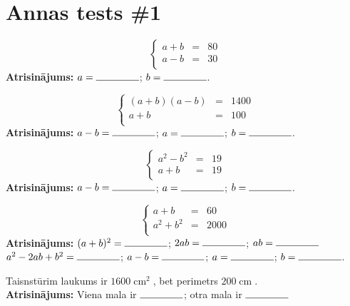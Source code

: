 \documentclass[11pt]{article}
\begin{document}
\section{Annas tests \#1}



\begin{problem}
\[
\left\{
\begin{array}{lcl}
a + b & = & 80 \\
a - b & = & 30 \\
\end{array}
\right.
\]
{\bf Atrisinājums:} $a = \rule{10ex}{.4pt}$; $b = \rule{10ex}{.4pt}$.
\end{problem}

\begin{problem}
\[
\left\{
\begin{array}{lcl}
(a+b)(a - b) & = & 1400 \\
a + b & = & 100 \\
\end{array}
\right.
\]
{\bf Atrisinājums:} $a - b = \rule{10ex}{.4pt}$; $a = \rule{10ex}{.4pt}$; $b = \rule{10ex}{.4pt}$.
\end{problem}

\begin{problem}
\[
\left\{
\begin{array}{lcl}
a^2 - b^2 & = & 19 \\
a + b & = & 19 \\
\end{array}
\right.
\]
{\bf Atrisinājums:} $a - b = \rule{10ex}{.4pt}$; $a = \rule{10ex}{.4pt}$; $b = \rule{10ex}{.4pt}$.
\end{problem}

\begin{problem}
\[
\left\{
\begin{array}{lcl}
a + b & = & 60 \\
a^2 + b^2 & = & 2000 \\
\end{array}
\right.
\]
{\bf Atrisinājums:} $(a + b)^2 = \rule{10ex}{.4pt}$; $2ab = \rule{10ex}{.4pt}$; $ab = \rule{10ex}{.4pt}$\\[5mm]
$a^2 - 2ab + b^2 = \rule{10ex}{.4pt}$; $a - b = \rule{10ex}{.4pt}$; $a = \rule{10ex}{.4pt}$;
$b = \rule{10ex}{.4pt}$.
\end{problem}


\begin{problem}
Taisnstūrim laukums ir $1600\operatorname{cm}^2$, bet perimetrs $200\operatorname{cm}$.\\[5mm]
{\bf Atrisinājums:} Viena mala ir $\rule{10ex}{.4pt}$; otra mala ir $\rule{10ex}{.4pt}$
\end{problem}
\end{document}
